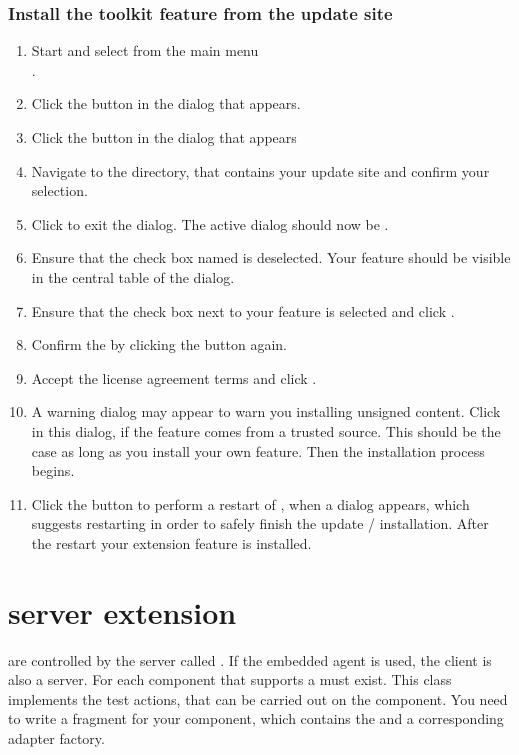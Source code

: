 \subsubsection{Install the toolkit feature from the update site}

\begin{enumerate}
\item Start \app{} and select from the main menu\\
.
\item Click the 
button in the  dialog that appears.
\item Click the  button in the  dialog
that appears
\item Navigate to the directory, that contains your update site and confirm your
selection.
\item Click  to exit the  dialog.
 The active dialog should now be .
\item Ensure that the check box named  is
deselected. Your feature should be visible in the central table of the dialog.
\item Ensure that the check box next to your feature is selected and click
 .
\item Confirm the  by clicking the 
 button again.
\item Accept the license agreement terms and click .
\item A warning dialog may appear to warn you installing unsigned content.
 Click  in this dialog, if the feature comes from a trusted
 source. This should be the case as long as you install your own feature.
 Then the installation process begins.
\item Click the  button to perform a restart of \app{},
 when a dialog appears, which suggests restarting \app{} in order to safely
 finish the update / installation.  After the restart your \app{} extension
 feature is installed.
\end{enumerate}

\section{\app{} server extension}
\label{serverExtension}

\gdauts{} are controlled by the server called \gdagent. If the embedded agent is
used, the \app{} client is also a server. For each component
that \app{} supports a \gdtesterclass must exist. This class implements the
test actions, that can be carried out on the component. You need to write a
fragment for your component, which contains the \gdtesterclass and a
corresponding adapter factory.


